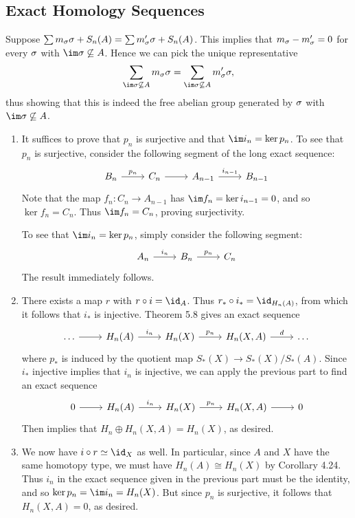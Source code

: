 \documentclass[../../solutions.tex]{subfiles}
\begin{document}
\subsection{Exact Homology Sequences}
\begin{exercise} \leavevmode
Suppose $\sum m_\sigma\sigma+S_n(A)=\sum m'_\sigma\sigma+S_n(A)$. 
This implies that $m_\sigma-m'_\sigma=0$ for every $\sigma$ with $\im\sig\not\subseteq A$. 
Hence we can pick the unique representative \[\sum_{\im\sig\not\subseteq A}m_\sig\sig=\sum_{\im\sig\not\subseteq A}m'_\sig\sig,\] thus showing that this is indeed the free abelian group generated by $\sigma$ with $\im\sig\not\subseteq A$. 
\end{exercise}

\begin{exercise} \leavevmode
\begin{enumerate}
\item It suffices to prove that $p_n$ is surjective and that $\im i_n=\ker p_n$. 
To see that $p_n$ is surjective, consider the following segment of the long exact sequence: 
\[\begin{tikzcd}
B_n\ar[r,"p_n"] & C_n \ar[r] & A_{n-1} \ar[r,"i_{n-1}"] & B_{n-1}
\end{tikzcd}\]
Note that the map $f_n:C_n\to A_{n-1}$ has $\im f_n=\ker i_{n-1}=0$, and so $\ker f_n=C_n$.
Thus $\im f_n=C_n$, proving surjectivity. 

To see that $\im i_n=\ker p_n$, simply consider the following segment: 
\[\begin{tikzcd}
A_n\ar[r,"i_n"] & B_n \ar[r,"p_n"] & C_n
\end{tikzcd}\]
The result immediately follows. 

\item There exists a map $r$ with $r\circ i=\id_A$. 
Thus $r_*\circ i_*=\id_{H_n(A)}$, from which it follows that $i_*$ is injective. 
Theorem 5.8 gives an exact sequence 
\[\begin{tikzcd}
\dots\ar[r] & H_n(A)\ar[r,"i_n"] & H_n(X)\ar[r,"p_n"] & H_n(X,A)\ar[r,"d"] & \dots
\end{tikzcd}\]
where $p_*$ is induced by the quotient map $S_*(X)\to S_*(X)/S_*(A)$.
Since $i_*$ injective implies that $i_n$ is injective, we can apply the previous part to find an exact sequence 
\[\begin{tikzcd}
0\ar[r] & H_n(A)\ar[r,"i_n"] & H_n(X)\ar[r,"p_n"] & H_n(X,A)\ar[r] & 0
\end{tikzcd}\]
Then  implies that $H_n\oplus H_n(X,A)=H_n(X)$, as desired. 

\item We now have $i\circ r\simeq\id_X$ as well.
In particular, since $A$ and $X$ have the same homotopy type, we must have $H_n(A)\cong H_n(X)$ by Corollary 4.24.
Thus $i_n$ in the exact sequence given in the previous part must be the identity, and so $\ker p_n=\im i_n=H_n(X)$. 
But since $p_n$ is surjective, it follows that $H_n(X,A)=0$, as desired. 
\end{enumerate}
\end{exercise}
\end{document}
